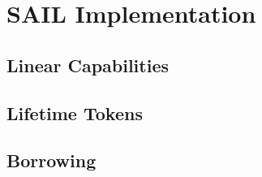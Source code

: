 \chapter{SAIL Implementation}


\section{Linear Capabilities}

\section{Lifetime Tokens}

\section{Borrowing}
